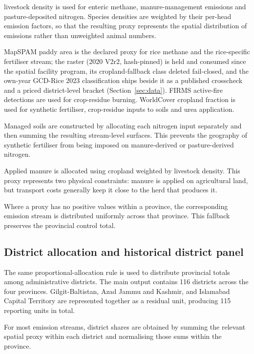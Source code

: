 \GLW{} livestock density is used for enteric methane, manure-management emissions and
pasture-deposited nitrogen. Species densities are weighted by their per-head emission
factors, so that the resulting proxy represents the spatial distribution of emissions rather
than unweighted animal numbers.

MapSPAM paddy area is the declared proxy for rice methane and the rice-specific
fertiliser stream; the raster (2020 V2r2, hash-pinned) is held and consumed since
the spatial facility program, its cropland-fallback class deleted fail-closed,
and the own-year GCD-Rice 2023 classification ships beside it as a published
crosscheck and a priced district-level bracket (Section~\ref{sec:data}). FIRMS
active-fire detections are used for crop-residue burning. WorldCover cropland fraction is
used for synthetic fertiliser, crop-residue inputs to soils and urea application.

Managed soils are constructed by allocating each nitrogen input separately and then summing
the resulting stream-level surfaces. This prevents the geography of synthetic fertiliser
from being imposed on manure-derived or pasture-derived nitrogen.

Applied manure is allocated using cropland weighted by livestock density. This proxy
represents two physical constraints: manure is applied on agricultural land, but transport
costs generally keep it close to the herd that produces it.

Where a proxy has no positive values within a province, the corresponding emission stream is
distributed uniformly across that province. This fallback preserves the provincial control
total.

\subsection{District allocation and historical district panel}
\label{sec:methods-district}

The same proportional-allocation rule is used to distribute provincial totals among
administrative districts. The main output contains 116 districts across the four provinces.
Gilgit-Baltistan, Azad Jammu and Kashmir, and Islamabad Capital Territory are represented
together as a residual unit, producing 115 reporting units in total.

For most emission streams, district shares are obtained by summing the relevant spatial
proxy within each district and normalising those sums within the province.

